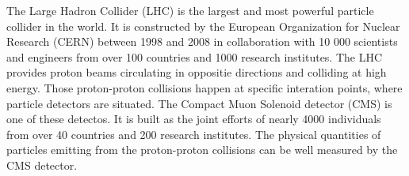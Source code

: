 The Large Hadron Collider (LHC) is the largest and most powerful particle collider in the world.
It is constructed by the European Organization for Nuclear Research (CERN) between 1998 and 2008 in collaboration with 10 000 scientists and engineers from over 100 countries and 1000 research institutes.
The LHC provides proton beams circulating in oppositie directions and colliding at high energy.
Those proton-proton collisions happen at specific interation points, where particle detectors are situated.
The Compact Muon Solenoid detector (CMS) is one of these detectos.
It is built as the joint efforts of nearly 4000 individuals from over 40 countries and 200 research institutes.
The physical quantities of particles emitting from the proton-proton collisions can be well measured by the CMS detector.
